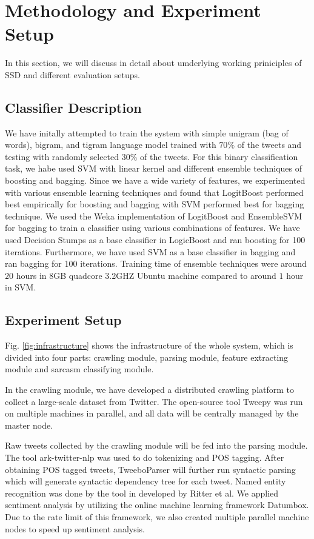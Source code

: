 \section{Methodology and Experiment Setup}
\label{sec:methodology}
In this section, we will discuss in detail about umderlying working priniciples of SSD and different evaluation setups.
\subsection{Classifier Description}
We have initally attempted to train the system with simple unigram (bag of words), bigram, and tigram language model trained with $70\%$ of the tweets and testing with randomly selected $30\%$ of the tweets. For this binary classification task, we habe used SVM \cite{libsvm} with linear kernel and different ensemble techniques of boosting and bagging. Since we have a wide variety of features, we experimented with various ensemble learning techniques and found that LogitBoost performed best
empirically for boosting and bagging with SVM performed best for bagging technique. We used the Weka implementation of LogitBoost \cite{Friedman98} and EnsembleSVM for bagging \cite{ensembleSVM} to train a classifier using various combinations of features. We have used Decision Stumps as a base classifier in LogicBoost and ran boosting for 100 iterations. Furthermore, 
we have used SVM as a base classifier in bagging and ran bagging for 100 iterations. Training time of ensemble techniques were around $20$ hours in 8GB quadcore 3.2GHZ Ubuntu machine compared to around $1$ hour in SVM.

\subsection{Experiment Setup}

Fig. \ref{fig:infrastructure} shows the infrastructure of the whole system, which is divided into four parts: crawling module, parsing module, feature extracting module and sarcasm classifying module.

In the crawling module, we have developed a distributed crawling platform to collect a large-scale dataset from Twitter. The open-source tool Tweepy\cite{tweepy} was run on multiple machines in parallel, and all data will be centrally managed by the master node.

Raw tweets collected by the crawling module will be fed into the parsing module. The tool ark-twitter-nlp\cite{tweetnlp} was used to do tokenizing and POS tagging. After obtaining POS tagged tweets, TweeboParser\cite{kong2014dependency} will further run syntactic parsing which will generate syntactic dependency tree for each tweet. Named entity recognition was done by the tool in developed by Ritter et al\cite{Ritter11}\cite{Ritter12}. We applied sentiment analysis by utilizing the online machine learning framework Datumbox\cite{datumbox}. Due to the rate limit of this framework, we also created multiple parallel machine nodes to speed up sentiment analysis.

